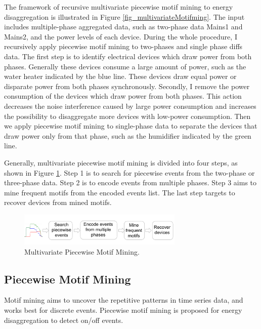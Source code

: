 The framework of recursive multivariate piecewise motif mining to energy disaggregation is illustrated in Figure \ref{fig_multivariateMotifming}. 
The input includes multiple-phase aggregated data, such as two-phase data Mains1 and Mains2, 
and the power levels of each device. 
During the whole procedure, I recursively apply piecewise motif mining to two-phases and single phase diffs data.
The first step is to identify electrical devices which draw power from both phases.
Generally these devices consume a large amount of power, such as the water heater indicated by the blue line.
These devices draw equal power or disparate power from both phases synchronously. 
Secondly, I remove the power consumption of the devices which draw power from both phases.
This action decreases the noise interference caused by large power consumption 
and increases the possibility to disaggregate more devices with low-power consumption. 
Then we apply piecewise motif mining to single-phase data to separate 
the devices that draw power only from that phase, 
such as the humidifier indicated by the green line. 

Generally, multivariate piecewise motif mining is divided into four steps, as shown in Figure \ref{fig_multivariatePiecewiseMotifMining}.
Step 1 is to search for piecewise events from the two-phase or three-phase data.
Step 2 is to encode events from multiple phases. 
Step 3 aims to mine frequent motifs from the encoded events list.
The last step targets to recover devices from mined motifs. 
\begin{figure}[h]
\centering
\includegraphics[width=0.7\textwidth]{multidisaggfig/multivariatePiecewiseMotifMining.pdf}
\caption{Multivariate Piecewise Motif Mining.}
\label{fig_multivariatePiecewiseMotifMining}
\end{figure}

\subsection{Piecewise Motif Mining}
Motif mining aims to uncover the repetitive patterns in time series data, and works best for discrete events. Piecewise motif mining is proposed 
for energy disaggregation to detect on/off events. 

